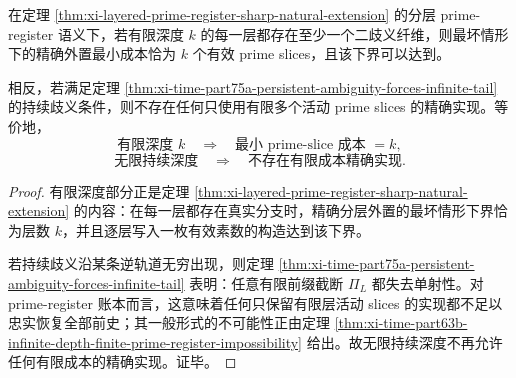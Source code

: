 \begin{corollary}\label{cor:xi-time-part75a-layered-externalization-depth-phase-transition}
在定理 \ref{thm:xi-layered-prime-register-sharp-natural-extension} 的分层 prime-register 语义下，若有限深度 \(k\) 的每一层都存在至少一个二歧义纤维，则最坏情形下的精确外置最小成本恰为 \(k\) 个有效 prime slices，且该下界可以达到。

相反，若满足定理 \ref{thm:xi-time-part75a-persistent-ambiguity-forces-infinite-tail} 的持续歧义条件，则不存在任何只使用有限多个活动 prime slices 的精确实现。等价地，
\[
\text{有限深度 }k
\quad\Longrightarrow\quad
\text{最小 prime-slice 成本 }=k,
\]
\[
\text{无限持续深度}
\quad\Longrightarrow\quad
\text{不存在有限成本精确实现}.
\]
\end{corollary}
\begin{proof}
有限深度部分正是定理 \ref{thm:xi-layered-prime-register-sharp-natural-extension} 的内容：在每一层都存在真实分支时，精确分层外置的最坏情形下界恰为层数 \(k\)，并且逐层写入一枚有效素数的构造达到该下界。

若持续歧义沿某条逆轨道无穷出现，则定理 \ref{thm:xi-time-part75a-persistent-ambiguity-forces-infinite-tail} 表明：任意有限前缀截断 \(\Pi_L\) 都失去单射性。对 prime-register 账本而言，这意味着任何只保留有限层活动 slices 的实现都不足以忠实恢复全部前史；其一般形式的不可能性正由定理 \ref{thm:xi-time-part63b-infinite-depth-finite-prime-register-impossibility} 给出。故无限持续深度不再允许任何有限成本的精确实现。证毕。
\end{proof}

